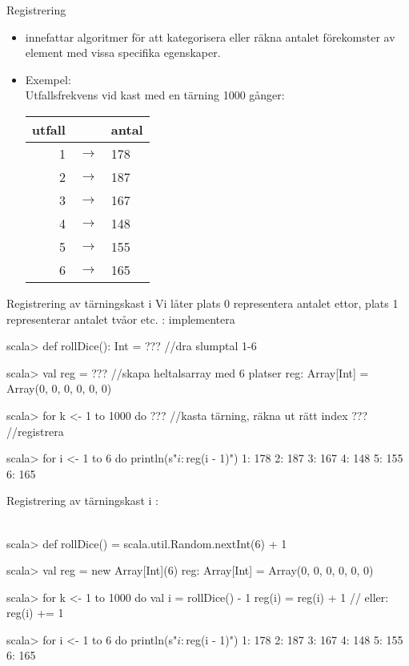 


\begin{Slide}{Registrering}
\begin{itemize}
\item {} innefattar algoritmer för att kategorisera eller räkna antalet förekomster av element med vissa specifika egenskaper.

\item Exempel:
\\\vspace{0.5em}Utfallsfrekvens vid kast med en tärning 1000 gånger:

\vspace{1em}\begin{tabular}{r c l}
utfall & & antal \\ \hline
1 & $\rightarrow$ & 178 \\
2 & $\rightarrow$ & 187 \\
3 & $\rightarrow$ & 167 \\
4 & $\rightarrow$ & 148 \\
5 & $\rightarrow$ & 155 \\
6 & $\rightarrow$ & 165 \\
\end{tabular}
\end{itemize}
\end{Slide}

\begin{Slide}{Registrering av tärningskast i }
Vi låter plats 0 representera antalet ettor, plats 1 representerar antalet tvåor etc. : implementera 
\begin{REPLnonum}
scala> def rollDice(): Int = ???  //dra slumptal 1-6

scala> val reg = ??? //skapa heltalsarray med 6 platser
reg: Array[Int] = Array(0, 0, 0, 0, 0, 0)

scala> for k <- 1 to 1000 do 
         ??? //kasta tärning, räkna ut rätt index 
         ??? //registrera

scala> for i <- 1 to 6 do println(s"$i: ${reg(i - 1)}")
1: 178
2: 187
3: 167
4: 148
5: 155
6: 165
\end{REPLnonum}
\end{Slide}


\begin{Slide}{Registrering av tärningskast i }
:\\~
\begin{REPLnonum}
scala> def rollDice() = scala.util.Random.nextInt(6) + 1

scala> val reg = new Array[Int](6)
reg: Array[Int] = Array(0, 0, 0, 0, 0, 0)

scala> for k <- 1 to 1000 do
         val i = rollDice() - 1 
         reg(i) = reg(i) + 1    // eller: reg(i) += 1

scala> for i <- 1 to 6 do println(s"$i: ${reg(i - 1)}")
1: 178
2: 187
3: 167
4: 148
5: 155
6: 165
\end{REPLnonum}
\end{Slide}

